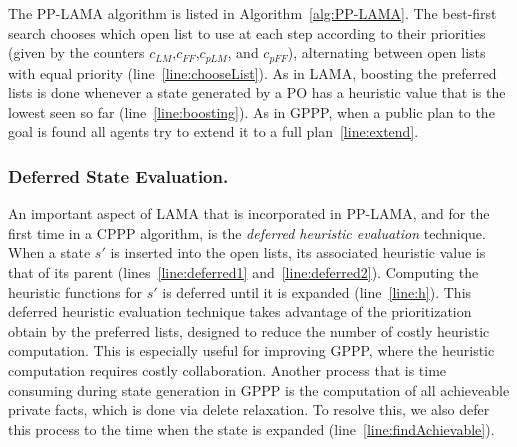 \documentclass[letterpaper]{article}
\theoremstyle{definition}
\begin{document}

The PP-LAMA algorithm is listed in Algorithm~\ref{alg:PP-LAMA}. The best-first search chooses which open list to use at each step according to their priorities (given by the counters $c_{LM}$,$c_{FF}$,$c_{pLM}$, and $c_{pFF}$), alternating between open lists with equal priority (line~\ref{line:chooseList}).
As in LAMA, boosting the preferred lists is done whenever a state generated by a PO has a heuristic value that is the lowest seen so far (line~\ref{line:boosting}). As in GPPP, when a public plan to the goal is found all agents try to extend it to a full plan~\ref{line:extend}.

\subsubsection{Deferred State Evaluation.} An important aspect of LAMA that is incorporated in PP-LAMA, and for the first time in a CPPP algorithm, is the {\em deferred heuristic evaluation} technique. When a state $s'$ is inserted into the open lists, its associated heuristic value is that of its parent (lines~\ref{line:deferred1} and~\ref{line:deferred2}). Computing the heuristic functions for $s'$ is deferred until it is expanded (line~\ref{line:h}). This deferred heuristic evaluation technique takes advantage of the prioritization obtain by the preferred lists, designed to reduce the number of costly heuristic computation. This is especially useful for improving GPPP, where the heuristic computation requires costly collaboration.
Another process that is time consuming during state generation in GPPP is the computation of all achieveable private facts, which is done via delete relaxation.
To resolve this, we also defer this process to the time when the state is expanded (line~\ref{line:findAchievable}).
\end{document}
